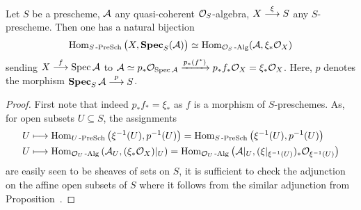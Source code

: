 \documentclass[a4paper,parskip=half,numbers=enddot, DIV=12]{scrreprt}
\begin{document}
\begin{prop}
    Let $S$ be a prescheme, $\mathcal{A}$ any quasi-coherent $\mathcal{O}_S$-algebra, $X\morphism[\xi] S$ any $S$-prescheme. Then one has a natural bijection
    \begin{align}\lbl{eq:SPECAdjunction}
        \Hom_{S\cat{-PreSch}} \big(X, \SPEC_S(\Aa)\big) \simeq \Hom_{\Oo_S\cat{-Alg}} (\Aa, \xi_* \Oo_X)
    \end{align}
    sending $X\morphism[f] \Spec \Aa$ to $\mathcal{A} \simeq p_* \mathcal{O}_{\operatorname{Spec} \mathcal{A}} \xrightarrow{p_*(f^*)} p_*f_* \mathcal{O}_X = \xi_* \mathcal{O}_X$. Here, $p$ denotes the morphism $\SPEC_S \Aa \morphism[p] S$.
\end{prop}
\begin{proof}
    First note that indeed $p_*f_*=\xi_*$ as $f$ is a morphism of $S$-preschemes. As, for open subsets $U\subseteq S$, the assignments
    \begin{align*}
        U&\longmapsto \operatorname{Hom}_{U\operatorname{-PreSch}} \left(\xi^{-1}(U), p^{-1}(U)\right) = \operatorname{Hom}_{S\operatorname{-PreSch}}\left(\xi^{-1}(U), p^{-1}(U)\right)\\
        U&\longmapsto \operatorname{Hom}_{\mathcal{O}_U\operatorname{-Alg}} \left(\mathcal{A}_U, (\xi_*\mathcal{O}_X)|_U\right) = \operatorname{Hom}_{\mathcal{O}_U\operatorname{-Alg}}\left(\mathcal{A}|_U, (\xi|_{\xi^{-1}(U)})_* \mathcal{O}_{\xi^{-1}(U)}\right)
    \end{align*}
    are easily seen to be sheaves of sets on $S$, it is sufficient to check the adjunction  on the affine open subsets of $S$ where it follows from the similar adjunction from Proposition~.
\end{proof}
\end{document}
